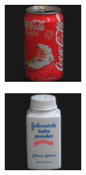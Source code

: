 \begin{figure}[htbp]
\begin{subfigure}{80pt}
    \caption{}
	\end{subfigure}
	\begin{subfigure}{80pt}
        \centering
    \includegraphics[width=\textwidth]{figures/coil_original/62.png}
    \caption{}
	\end{subfigure}
	\begin{subfigure}{80pt}
        \centering
    \includegraphics[width=\textwidth]{figures/coil_original/64.png}

\end{subfigure}
\end{figure}
